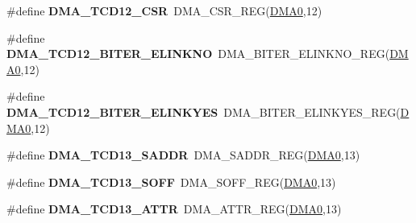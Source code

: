 \begin{DoxyCompactItemize}
\item 
\#define {\bfseries D\+M\+A\+\_\+\+T\+C\+D12\+\_\+\+C\+SR}~D\+M\+A\+\_\+\+C\+S\+R\+\_\+\+R\+EG(\hyperlink{group__DMA__Peripheral__Access__Layer_ga4103044f9ca209772f513dc694513ffb}{D\+M\+A0},12)\hypertarget{group__DMA__Register__Accessor__Macros_ga20541e42162680378136b1da043ba15b}{}\label{group__DMA__Register__Accessor__Macros_ga20541e42162680378136b1da043ba15b}

\item 
\#define {\bfseries D\+M\+A\+\_\+\+T\+C\+D12\+\_\+\+B\+I\+T\+E\+R\+\_\+\+E\+L\+I\+N\+K\+NO}~D\+M\+A\+\_\+\+B\+I\+T\+E\+R\+\_\+\+E\+L\+I\+N\+K\+N\+O\+\_\+\+R\+EG(\hyperlink{group__DMA__Peripheral__Access__Layer_ga4103044f9ca209772f513dc694513ffb}{D\+M\+A0},12)\hypertarget{group__DMA__Register__Accessor__Macros_gafbb305fbbbe14b18f2425921555a875b}{}\label{group__DMA__Register__Accessor__Macros_gafbb305fbbbe14b18f2425921555a875b}

\item 
\#define {\bfseries D\+M\+A\+\_\+\+T\+C\+D12\+\_\+\+B\+I\+T\+E\+R\+\_\+\+E\+L\+I\+N\+K\+Y\+ES}~D\+M\+A\+\_\+\+B\+I\+T\+E\+R\+\_\+\+E\+L\+I\+N\+K\+Y\+E\+S\+\_\+\+R\+EG(\hyperlink{group__DMA__Peripheral__Access__Layer_ga4103044f9ca209772f513dc694513ffb}{D\+M\+A0},12)\hypertarget{group__DMA__Register__Accessor__Macros_ga2b17649d2bc48a65938316a07ce7424f}{}\label{group__DMA__Register__Accessor__Macros_ga2b17649d2bc48a65938316a07ce7424f}

\item 
\#define {\bfseries D\+M\+A\+\_\+\+T\+C\+D13\+\_\+\+S\+A\+D\+DR}~D\+M\+A\+\_\+\+S\+A\+D\+D\+R\+\_\+\+R\+EG(\hyperlink{group__DMA__Peripheral__Access__Layer_ga4103044f9ca209772f513dc694513ffb}{D\+M\+A0},13)\hypertarget{group__DMA__Register__Accessor__Macros_ga5daa84539093d0893fdc44fe66a428b6}{}\label{group__DMA__Register__Accessor__Macros_ga5daa84539093d0893fdc44fe66a428b6}

\item 
\#define {\bfseries D\+M\+A\+\_\+\+T\+C\+D13\+\_\+\+S\+O\+FF}~D\+M\+A\+\_\+\+S\+O\+F\+F\+\_\+\+R\+EG(\hyperlink{group__DMA__Peripheral__Access__Layer_ga4103044f9ca209772f513dc694513ffb}{D\+M\+A0},13)\hypertarget{group__DMA__Register__Accessor__Macros_ga16316fcc7464927e4acc256cc841b340}{}\label{group__DMA__Register__Accessor__Macros_ga16316fcc7464927e4acc256cc841b340}

\item 
\#define {\bfseries D\+M\+A\+\_\+\+T\+C\+D13\+\_\+\+A\+T\+TR}~D\+M\+A\+\_\+\+A\+T\+T\+R\+\_\+\+R\+EG(\hyperlink{group__DMA__Peripheral__Access__Layer_ga4103044f9ca209772f513dc694513ffb}{D\+M\+A0},13)\hypertarget{group__DMA__Register__Accessor__Macros_ga28f938b232c24344f2cc299689aeb089}{}\label{group__DMA__Register__Accessor__Macros_ga28f938b232c24344f2cc299689aeb089}


\end{DoxyCompactItemize}
